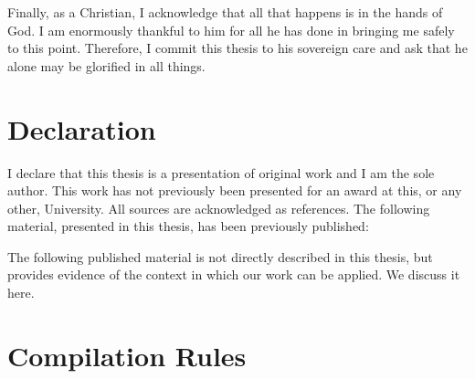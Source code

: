 \documentclass[a4paper,11pt,twoside,openright]{report}
\newif\ifFullModel
\newcommand{\IfFullModel}[1]{\ifFullModel #1 \fi}
\newcommand{\IfNotFullModel}[1]{\ifFullModel \else #1 \fi}
\begin{document}
Finally, as a Christian, I acknowledge that all that happens is in the
hands of God. 
I am enormously thankful to him for all he has done in bringing me
safely to this point. 
Therefore, I commit this thesis to his sovereign care and ask that he
alone may be glorified in all things.


\cleardoublepage
{}
{}
\chapter*{Declaration}

I declare that this thesis is a presentation of original work and I am
the sole author. 
This work has not previously been presented for an award at this, or
any other, University. 
All sources are acknowledged as references.
The following material, presented in this thesis, has been previously
published:

\begin{refsegment}
  \raggedright
  \nocite{baxter2015a,baxter2017}
  \setlength{\bibitemsep}{0.5cm}
  \printbibliography[resetnumbers=true,segment=\therefsegment,heading=none]
\end{refsegment}

The following published material is not directly described in this
thesis, but provides evidence of the context in which our work can be
applied. We discuss it here.

\begin{refsegment}
  \raggedright
  \nocite{freitas2016}
  \setlength{\bibitemsep}{0.5cm}
  \printbibliography[resetnumbers=3,segment=\therefsegment,heading=none]
\end{refsegment}
















\appendix

\FullModeltrue
\chapter{Compilation Rules}
\label{compilation-rules-appendix}



{\raggedright \printbibliography[resetnumbers=true]}
\end{document}
